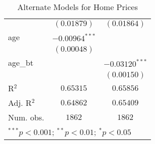 \begin{table}
\begin{center}
\begin{tabular}{l c c}
                           & $(0.01879)$      & $(0.01864)$      \\
age                        & $-0.00964^{***}$ &                  \\
                           & $(0.00048)$      &                  \\
age\_bt                    &                  & $-0.03120^{***}$ \\
                           &                  & $(0.00150)$      \\
\hline
R$^2$                      & $0.65315$        & $0.65856$        \\
Adj. R$^2$                 & $0.64862$        & $0.65409$        \\
Num. obs.                  & $1862$           & $1862$           \\
\hline
\multicolumn{3}{l}{\scriptsize{$^{***}p<0.001$; $^{**}p<0.01$; $^{*}p<0.05$}}
\end{tabular}
\caption{Alternate Models for Home Prices}
\label{tab:reg_sq_age_bt}
\end{center}
\end{table}
